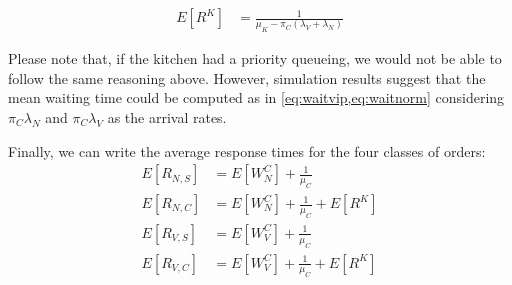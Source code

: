 \begin{align}
    E[R^K] &= \frac{1}{\mu_K-\pi_C(\lambda_{V}+\lambda_{N})}
\end{align}

Please note that, if the kitchen had a priority queueing, we would not be able
to follow the same reasoning above. However, simulation results suggest that 
the mean waiting time could be computed as in \cref{eq:waitvip,eq:waitnorm}
considering $\pi_C \lambda_N$ and $\pi_C \lambda_V$ as the arrival rates.

Finally, we can write the average response times for the four classes of orders:
\begin{align}
    E[R_{N,S}] &= E[W^C_{N}] + \frac{1}{\mu_C} \\
    E[R_{N,C}] &= E[W^C_{N}] + \frac{1}{\mu_C} + E[R^K] \\
    E[R_{V,S}] &= E[W^C_{V}] + \frac{1}{\mu_C} \\
    E[R_{V,C}] &= E[W^C_{V}] + \frac{1}{\mu_C} + E[R^K]
\end{align}